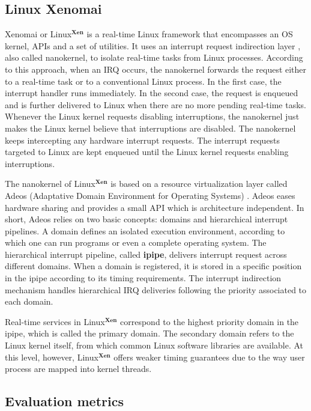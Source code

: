 \documentclass{acm_proc_article-sp}
\begin{document}
\subsection{Linux Xenomai}
\label{sec:xenomai}

Xenomai or Linux$^{\mathbf{Xen}}$ is a real-time Linux framework that encompasses an
OS kernel, APIs and a set of utilities. It uses an interrupt request indirection
layer \cite{Stodolsky93}, also called nanokernel, to isolate real-time tasks from
Linux processes. According to this approach, when an IRQ occurs, the nanokernel
forwards the request either to a real-time task or to a conventional Linux
process. In the first case, the interrupt handler runs immediately. In the second
case, the request is enqueued and is further delivered to Linux when there are no
more pending real-time tasks. Whenever the Linux kernel requests disabling
interruptions, the nanokernel just makes the Linux kernel believe that interruptions
are disabled. The nanokernel keeps intercepting any hardware interrupt requests.
The interrupt requests targeted to Linux are kept enqueued until the Linux kernel
requests enabling interruptions.

The nanokernel of Linux$^{\mathbf{Xen}}$ is based on a resource virtualization layer
called Adeos (Adaptative Domain Environment for Operating Systems)
\cite{Yaghmour01}. Adeos eases hardware sharing and provides a small API which is
architecture independent. In short, Adeos relies on two basic concepts: domains and
hierarchical interrupt pipelines. A domain defines an isolated execution
environment, according to which one can run programs or even a complete operating
system. The hierarchical interrupt pipeline, called \textbf{ipipe}, delivers 
interrupt request across different domains. When a domain is registered, it is
stored in a specific position in the ipipe according to its timing requirements. The
interrupt indirection mechanism handles hierarchical IRQ deliveries following
the priority associated to each domain.

Real-time services in Linux$^{\mathbf{Xen}}$ correspond to the highest priority
domain in the ipipe, which is called the primary domain. The secondary domain refers
to the Linux kernel itself, from which common Linux software libraries are
available. At this level, however, Linux$^{\mathbf{Xen}}$ offers weaker timing
guarantees due to the way user process are mapped into kernel threads.

\subsection{Evaluation metrics}
\label{sec:evalMetrics}
\end{document}
